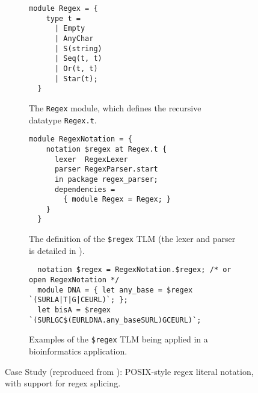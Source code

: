 \documentclass[acmsmall]{acmart}
\newcommand{\li}[1]{\lstinline[basicstyle=\ttfamily\fontsize{9pt}{1em}\selectfont]{#1}}
\theoremstyle{slplain}
\numberwithin{thm}{section}
\begin{document}
\begin{figure}[t]
\begin{subfigure}[t]{0.45\textwidth}
\vspace{-1px}
\begin{lstlisting}[mathescape=~]
  module Regex = {
    type t = 
      | Empty
      | AnyChar 
      | S(string)
      | Seq(t, t) 
      | Or(t, t) 
      | Star(t);
  }
\end{lstlisting}
\vspace{-5px}
\caption{The \li{Regex} module, which defines the recursive datatype \li{Regex.t}.}
\label{fig:Regex-module-def}
\end{subfigure}
\hfill
\begin{subfigure}[t]{0.53\textwidth}
\vspace{-1px}
\begin{lstlisting}[mathescape=|]
  module RegexNotation = {
    notation $regex at Regex.t {
      lexer  RegexLexer  
      parser RegexParser.start
      in package regex_parser;
      dependencies = 
        { module Regex = Regex; }
    }
  }
\end{lstlisting}
\vspace{-5px}
\caption{The definition of the \li{$regex} TLM (the lexer and parser is detailed in \cite{TLMs-paper}).}
\label{fig:regex-tlm-def}
\end{subfigure}

\begin{subfigure}[t]{\textwidth}
\vspace{5px}
\begin{lstlisting}
  notation $regex = RegexNotation.$regex; /* or open RegexNotation */
  module DNA = { let any_base = $regex `(SURLA|T|G|CEURL)`; };
  let bisA = $regex `(SURLGC$(EURLDNA.any_baseSURL)GCEURL)`;
\end{lstlisting}
\vspace{-4px}
\caption{Examples of the \li{$regex} TLM being applied in a bioinformatics application. %
}
\label{fig:first-tlm-example}
\end{subfigure}
\vspace{3px}
\caption{Case Study (reproduced from \cite{TLMs-paper}): POSIX-style regex literal notation, with support for regex splicing.}
\vspace{-4px}
\label{fig:regex-case-study}
\end{figure}
\end{document}
